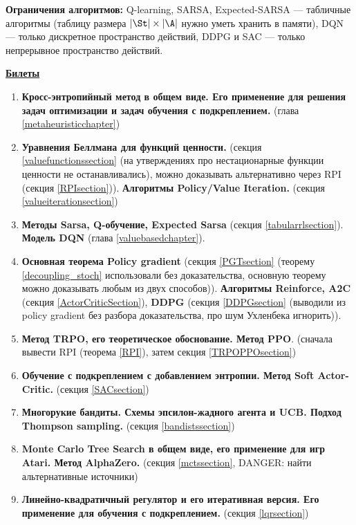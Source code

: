 \vspace{0.3cm}
\textbf{Ограничения алгоритмов:} Q-learning, SARSA, Expected-SARSA --- табличные алгоритмы (таблицу размера $|\St| \times |\A|$ нужно уметь хранить в памяти), DQN --- только дискретное пространство действий, DDPG и SAC --- только непрерывное пространство действий.

\newpage
\begin{center}
\textcolor{ChadBlue}{\underline{\textbf{Билеты}}}   
\end{center}

\begin{enumerate}
\item \textbf{Кросс-энтропийный метод в общем виде. Его применение для решения задач оптимизации и
задач обучения с подкреплением.} (глава \ref{metaheuristicchapter})
\item \textbf{Уравнения Беллмана для функций ценности.} (секция \ref{valuefunctionssection} (на утверждениях про нестационарные функции ценности не останавливались), можно доказывать альтернативно через RPI (секция \ref{RPIsection})). \textbf{Алгоритмы Policy/Value Iteration.} (секция \ref{valueiterationsection})
\item \textbf{Методы Sarsa, Q-обучение, Expected Sarsa} (секция \ref{tabularrlsection}). \textbf{Модель DQN} (глава \ref{valuebasedchapter}).
\item \textbf{Основная теорема Policy gradient} (секция \ref{PGTsection} (теорему \ref{decoupling_stoch} использовали без доказательства, основную теорему можно доказывать любым из двух способов)). \textbf{Алгоритмы Reinforce, A2C} (секция \ref{ActorCriticSection}), \textbf{DDPG} (секция \ref{DDPGsection} (выводили из policy gradient без разбора доказательства, про шум Ухленбека игнорить)).
\item \textbf{Метод TRPO, его теоретическое обоснование. Метод PPO}. (сначала вывести RPI (теорема \ref{RPI}), затем секция \ref{TRPOPPOsection})
\item \textbf{Обучение с подкреплением с добавлением энтропии. Метод Soft Actor-Critic.} (секция \ref{SACsection})
\item \textbf{Многорукие бандиты. Схемы эпсилон-жадного агента и UCB. Подход Thompson sampling.} (секция \ref{bandistssection})
\item \textbf{Monte Carlo Tree Search в общем виде, его применение для игр Atari. Метод AlphaZero.} (секция \ref{mctssection}, \textcolor{ChadRed}{DANGER}: найти альтернативные источники)
\item \textbf{Линейно-квадратичный регулятор и его итеративная версия. Его применение для обучения с
подкреплением.} (секция \ref{lqrsection})
\end{enumerate}